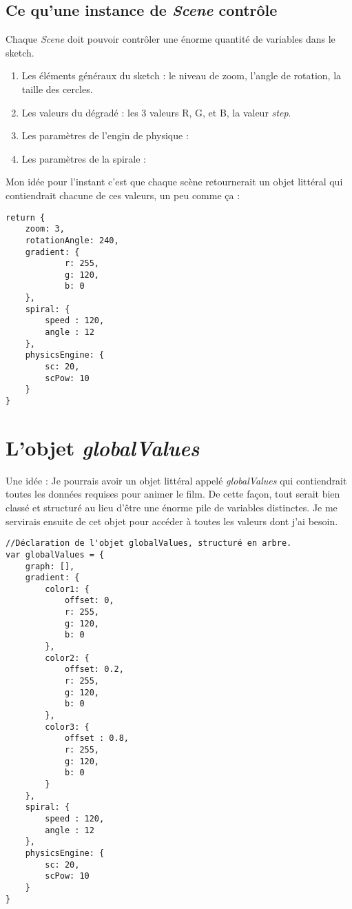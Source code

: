 \subsection{Ce qu'une instance de \textit{Scene} contrôle}
Chaque \textit{Scene} doit pouvoir contrôler une énorme quantité de variables dans le sketch.
\begin{enumerate}
\item Les éléments généraux du sketch : le niveau de zoom, l'angle de rotation, la taille des cercles.
\item Les valeurs du dégradé : les 3 valeurs R, G, et B, la valeur \textit{step}.
\item Les paramètres de l'engin de physique : 
\item Les paramètres de la spirale : 
\end{enumerate}

Mon idée pour l'instant c'est que chaque scène retournerait un objet littéral qui contiendrait chacune de ces valeurs, un peu comme ça : 
\begin{lstlisting}
return {
    zoom: 3,
    rotationAngle: 240,
    gradient: {
            r: 255,
            g: 120,
            b: 0
    },
    spiral: {
        speed : 120,
        angle : 12
    },
    physicsEngine: {
        sc: 20,
        scPow: 10
    }
}

\end{lstlisting}

\section{L'objet \textit{globalValues}}
Une idée : Je pourrais avoir un objet littéral appelé \textit{globalValues} qui contiendrait toutes les données requises pour animer le film. De cette façon, tout serait bien classé et structuré au lieu d'être une énorme pile de variables distinctes. Je me servirais ensuite de cet objet pour accéder à toutes les valeurs dont j'ai besoin.
\begin{lstlisting}
//Déclaration de l'objet globalValues, structuré en arbre.
var globalValues = {
    graph: [],
    gradient: {
        color1: {
            offset: 0,
            r: 255,
            g: 120,
            b: 0
        },
        color2: {
            offset: 0.2,
            r: 255,
            g: 120,
            b: 0
        },
        color3: {
            offset : 0.8,
            r: 255,
            g: 120,
            b: 0
        }
    },
    spiral: {
        speed : 120,
        angle : 12
    },
    physicsEngine: {
        sc: 20,
        scPow: 10
    }
}


\end{lstlisting}

